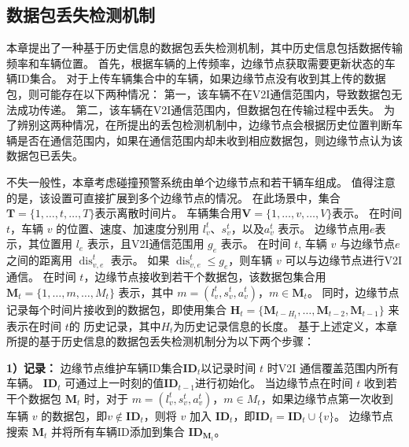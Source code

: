 \subsection[\hspace{-2pt}数据包丢失检测机制]{{ \hspace{-8pt}数据包丢失检测机制}}

本章提出了一种基于历史信息的数据包丢失检测机制，其中历史信息包括数据传输频率和车辆位置。
首先，根据车辆的上传频率，边缘节点获取需要更新状态的车辆ID集合。
对于上传车辆集合中的车辆，如果边缘节点没有收到其上传的数据包，则可能存在以下两种情况：
第一，该车辆不在V2I通信范围内，导致数据包无法成功传递。
第二，该车辆在V2I通信范围内，但数据包在传输过程中丢失。
为了辨别这两种情况，在所提出的丢包检测机制中，边缘节点会根据历史位置判断车辆是否在通信范围内，如果在通信范围内却未收到相应数据包，则边缘节点认为该数据包已丢失。

不失一般性，本章考虑碰撞预警系统由单个边缘节点和若干辆车组成。
值得注意的是，该设置可直接扩展到多个边缘节点的情况。
在此场景中，集合$\mathbf{T}=\{1, \ldots, t, \ldots, T\}$表示离散时间片。
车辆集合用$\mathbf{V}=\{1, \ldots, v, \ldots, V\}$表示。
在时间 $t$，车辆 $v$ 的位置、速度、加速度分别用 $l_{v}^{t}$、$s_{v}^{t}$，以及$a_{v}^{t}$ 表示。
边缘节点用$e$表示，其位置用 ${l}_{e}$ 表示，且V2I通信范围用 $g_e$ 表示。
在时间 $t$, 车辆 $v$ 与边缘节点$e$之间的距离用 $\operatorname{dis}_{v, e}^{t}$ 表示。
如果 $\operatorname{dis}_{v, e}^{t} \leq g_e$，则车辆 ${v}$ 可以与边缘节点进行V2I通信。
在时间 $t$，边缘节点接收到若干个数据包，该数据包集合用 $\mathbf{M}_{t}=\{1, \ldots, m, \ldots, {M}_t\}$ 表示，其中 $m =(l_{v}^{t}, s_{v}^{t}, a_{v}^{t})$，$m \in \mathbf{M}_{t}$。
同时，边缘节点记录每个时间片接收到的数据包，即使用集合 ${\mathbf{H}_{t}} = \{\mathbf{M}_{t-{H}_{t}}, \ldots, \mathbf{M}_{t-2}, \mathbf{M}_{t-1}\}$ 来表示在时间 $t$的 历史记录，其中${H}_{t}$为历史记录信息的长度。
基于上述定义，本章所提的基于历史信息的数据包丢失检测机制分为以下两个步骤：

\textbf{1）记录：}
边缘节点维护车辆ID集合$\mathbf{ID}_{t}$以记录时间 $t$ 时V2I 通信覆盖范围内所有车辆。
$\mathbf{ID}_{t}$ 可通过上一时刻的值$\mathbf{ID}_{t-1}$进行初始化。 
当边缘节点在时间 $t$ 收到若干个数据包 $\mathbf{M}_{t}$ 时，对于 $m =(l_{v}^{t}, s_{v}^{t}, a_{v}^{t})$，${m} \in M_{t}$，如果边缘节点第一次收到车辆 $v$ 的数据包，即${v} \notin \mathbf{ID}_{t}$，则将 $v$ 加入 $\mathbf{ID}_{t}$，即$\mathbf{ID}_{t} = \mathbf{ID}_{t} \cup \{v\}$。
边缘节点搜索 $\mathbf{M}_{t}$ 并将所有车辆ID添加到集合 $\mathbf{ID}_{\mathbf{M}_{t}}$。

